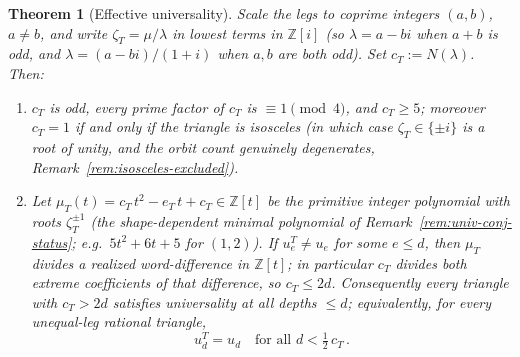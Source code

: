 \documentclass[11pt,a4paper]{article}
\newtheorem{theorem}{Theorem}
\theoremstyle{remark}
\theoremstyle{plain}
\begin{document}
\begin{theorem}[Effective universality]
\label{thm:effective-universality}
Scale the legs to coprime integers $(a, b)$, $a \neq b$, and write
$\zeta_T = \mu/\lambda$ in lowest terms in $\mathbb{Z}[i]$ (so
$\lambda = a - bi$ when $a + b$ is odd, and $\lambda = (a-bi)/(1+i)$
when $a, b$ are both odd).  Set $c_T := N(\lambda)$.  Then:
\begin{enumerate}[label=(\roman*),itemsep=0.1em]
\item $c_T$ is odd, every prime factor of $c_T$ is $\equiv 1 \pmod 4$,
and $c_T \ge 5$; moreover $c_T = 1$ if and only if the triangle is
isosceles (in which case $\zeta_T \in \{\pm i\}$ is a root of unity, and
the orbit count genuinely degenerates,
Remark~\ref{rem:isosceles-excluded}).
\item Let $\mu_T(t) = c_T\, t^2 - e_T\, t + c_T \in \mathbb{Z}[t]$
be the primitive integer polynomial with roots $\zeta_T^{\pm 1}$ (the
shape-dependent minimal polynomial of
Remark~\ref{rem:univ-conj-status}; e.g.\ $5t^2+6t+5$ for $(1,2)$).  If
$u_e^T \neq u_e$ for some $e \le d$, then $\mu_T$ divides a realized
word-difference in $\mathbb{Z}[t]$; in particular $c_T$ divides
\emph{both extreme coefficients} of that difference, so
$c_T \le 2d$.  Consequently \emph{every} triangle with $c_T > 2d$
satisfies universality at all depths $\le d$; equivalently, for every
unequal-leg rational triangle,
\[
u_d^T = u_d \quad\text{for all } d < \tfrac{1}{2}\, c_T \, .
\]
\end{enumerate}
\end{theorem}
\end{document}
